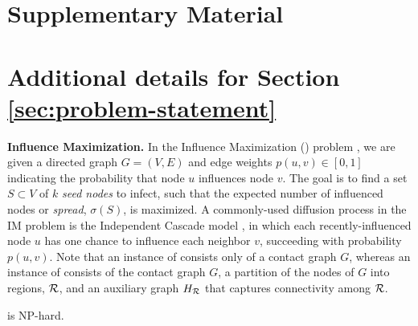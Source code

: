 \section*{Supplementary Material}

\section{Additional details for Section \ref{sec:problem-statement}}
\label{sec:problem-statement-app}
\noindent
\textbf{Influence Maximization.} In the Influence Maximization (\infmax) problem \cite{kempe:sigkdd03}, we are given a directed graph $G=(V,E)$ and edge weights $p(u, v) \in [0, 1]$ indicating the probability that node $u$ influences node $v$. The goal is to find a set $S \subset V$ of $k$ \emph{seed nodes} to infect, such that the expected number of influenced nodes or \emph{spread}, $\sigma(S)$, is maximized. A commonly-used diffusion process in the IM problem is the Independent Cascade model \cite{kempe:sigkdd03}, in which each recently-influenced node $u$ has one chance to influence each neighbor $v$, succeeding with probability $p(u,v)$.
Note that an instance of \infmax{} consists only of a contact graph $G$, whereas an instance of \maxcrit{} consists of the contact graph $G$, a partition of the nodes of $G$ into regions, $\mathcal{R}$, and an
auxiliary graph $H_{\mathcal{R}}$ that captures connectivity among $\mathcal{R}$.

\begin{theorem}
\maxcrit{} is NP-hard. 
\end{theorem}

